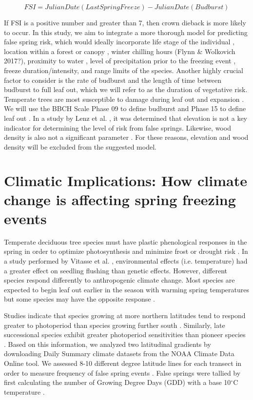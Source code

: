 \documentclass{article}\usepackage[]{graphicx}\usepackage[]{color}
\begin{document}
\[ FSI = Julian Date (Last Spring Freeze) - Julian Date (Budburst) \]

If FSI is a positive number and greater than 7, then crown dieback is more likely to occur. In this study, we aim to integrate a more thorough model for predicting false spring risk, which would ideally incorporate life stage of the individual \citep{Caffarra2011}, location within a forest or canopy \citep{Augspurger2013}, winter chilling hours (Flynn \& Wolkovich 2017?), proximity to water \citep{Gu2008}, level of precipitation prior to the freezing event \citep{Anderegg2013}, freeze duration/intensity, and range limits of the species. Another highly crucial factor to consider is the rate of budburst and the length of time between budburst to full leaf out, which we will refer to as the duration of vegetative risk. Temperate trees are most susceptible to damage during leaf out and expansion \citep{Vitasse2014}. We will use the BBCH Scale Phase 09 to define budburst and Phase 15 to define leaf out \citep{Meier2001}. In a study by Lenz et al. \citeyear{Lenz2013}, it was determined that elevation is not a key indicator for determining the level of risk from false springs. Likewise, wood density is also not a significant parameter \citep{Augspurger2009}. For these reasons, elevation and wood density will be excluded from the suggested model. 

\section{Climatic Implications: How climate change is affecting spring freezing events}
Temperate deciduous tree species must have plastic phenological responses in the spring in order to optimize photosynthesis and minimize frost or drought risk \citep{Polgar2011}. In a study performed by Vitasse et al. \citeyear{Vitasse2013}, environmental effects (i.e. temperature) had a greater effect on seedling flushing than genetic effects. However, different species respond differently to anthropogenic climate change. Most species are expected to begin leaf out earlier in the season with warming spring temperatures but some species may have the opposite response \citep{Xin2016, Cleland2006, Yu2010}.

Studies indicate that species growing at more northern latitudes tend to respond greater to photoperiod than species growing further south \citep{Caffarra2011}. Similarly, late successional species exhibit greater photoperiod sensitivities than pioneer species \citep{Basler2012}. Based on this information, we analyzed two latitudinal gradients by downloading Daily Summary climate datasets from the NOAA Climate Data Online tool. We assessed 8-10 different degree latitude lines for each transect in order to measure frequency of false spring events \citep{Menne2012, Menne2012b}. False springs were tallied by first calculating the number of Growing Degree Days (GDD) with a base 10$^{\circ}$C temperature \citep{Nugent2005}.
\end{document}
